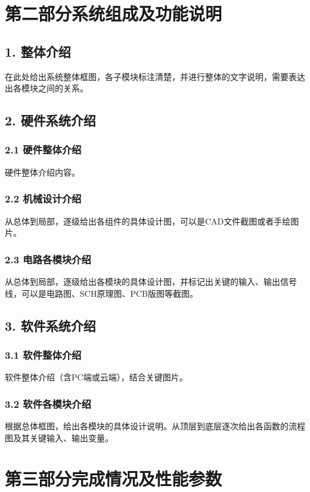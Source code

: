 \documentclass[12pt, a4paper]{article}
\begin{document}
\section*{第二部分\quad 系统组成及功能说明}

\subsection*{1. 整体介绍}
在此处给出系统整体框图，各子模块标注清楚，并进行整体的文字说明，需要表达出各模块之间的关系。

\subsection*{2. 硬件系统介绍}
\subsubsection*{2.1 硬件整体介绍}
硬件整体介绍内容。

\subsubsection*{2.2 机械设计介绍}
从总体到局部，逐级给出各组件的具体设计图，可以是CAD文件截图或者手绘图片。

\subsubsection*{2.3 电路各模块介绍}
从总体到局部，逐级给出各模块的具体设计图，并标记出关键的输入、输出信号线，可以是电路图、SCH原理图、PCB版图等截图。

\subsection*{3. 软件系统介绍}
\subsubsection*{3.1 软件整体介绍}
软件整体介绍（含PC端或云端），结合关键图片。

\subsubsection*{3.2 软件各模块介绍}
根据总体框图，给出各模块的具体设计说明。从顶层到底层逐次给出各函数的流程图及其关键输入、输出变量。

\section*{第三部分\quad 完成情况及性能参数}
\end{document}
